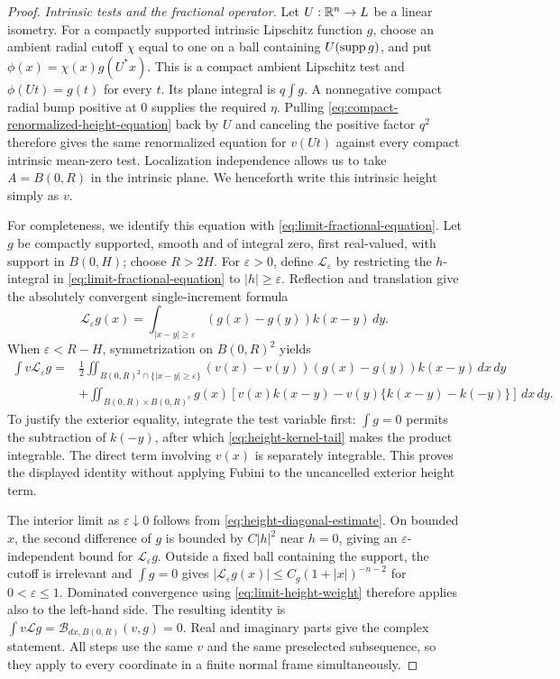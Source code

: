 \begin{proof}
\emph{Intrinsic tests and the fractional operator.}
Let $U:\mathbb R^n\to L$ be a linear isometry.  For a compactly supported
intrinsic Lipschitz function $g$, choose an ambient radial cutoff $\chi$
equal to one on a ball containing $U(\operatorname{supp} g)$, and put
$\phi(x)=\chi(x)g(U^*x)$.
This is a compact ambient Lipschitz test and
$\phi(Ut)=g(t)$ for every $t$.  Its plane integral is $q\int g$.
A nonnegative compact radial bump positive at $0$ supplies the required
$\eta$.  Pulling \eqref{eq:compact-renormalized-height-equation} back by
$U$ and canceling the positive factor $q^2$ therefore gives the same
renormalized equation for $v(Ut)$ against every compact intrinsic
mean-zero test.  Localization independence allows us to take
$A=B(0,R)$ in the intrinsic plane.  We henceforth write this intrinsic
height simply as $v$.

For completeness, we identify this equation with
\eqref{eq:limit-fractional-equation}.  Let $g$ be compactly supported,
smooth and of integral zero, first real-valued, with support in $B(0,H)$;
choose $R>2H$.  For $\varepsilon>0$, define $\mathcal L_\varepsilon$
by restricting the $h$-integral in \eqref{eq:limit-fractional-equation}
to $|h|\ge\varepsilon$.  Reflection and translation give the absolutely
convergent single-increment formula
\[
 \mathcal L_\varepsilon g(x)
    =\int_{|x-y|\ge\varepsilon}(g(x)-g(y))k(x-y)\,dy.
\]
When $\varepsilon<R-H$, symmetrization on $B(0,R)^2$ yields
\begin{align*}
 \int v\mathcal L_\varepsilon g
 ={}&\frac12\iint_{B(0,R)^2\cap\{|x-y|\ge\varepsilon\}}
       (v(x)-v(y))(g(x)-g(y))k(x-y)\,dx\,dy\\
 &+\iint_{B(0,R)\times B(0,R)^c}g(x)
       [v(x)k(x-y)-v(y)\{k(x-y)-k(-y)\}]\,dx\,dy.
\end{align*}
To justify the exterior equality, integrate the test variable first:
$\int g=0$ permits the subtraction of $k(-y)$, after which
\eqref{eq:height-kernel-tail} makes the product integrable.  The direct
term involving $v(x)$ is separately integrable.  This proves the displayed
identity without applying Fubini to the uncancelled exterior height term.

The interior limit as $\varepsilon\downarrow0$ follows from
\eqref{eq:height-diagonal-estimate}.  On bounded $x$, the second difference
of $g$ is bounded by $C|h|^2$ near $h=0$, giving an
$\varepsilon$-independent bound for $\mathcal L_\varepsilon g$.
Outside a fixed ball containing the support, the cutoff is irrelevant and
$\int g=0$ gives
$|\mathcal L_\varepsilon g(x)|\le C_g(1+|x|)^{-n-2}$ for
$0<\varepsilon\le1$.  Dominated convergence using
\eqref{eq:limit-height-weight} therefore applies also to the left-hand
side.  The resulting identity is
$\int v\mathcal Lg=\mathcal B_{dx,B(0,R)}(v,g)=0$.
Real and imaginary parts give the complex statement.  All steps use the
same $v$ and the same preselected subsequence, so they apply to every
coordinate in a finite normal frame simultaneously.
\end{proof}

